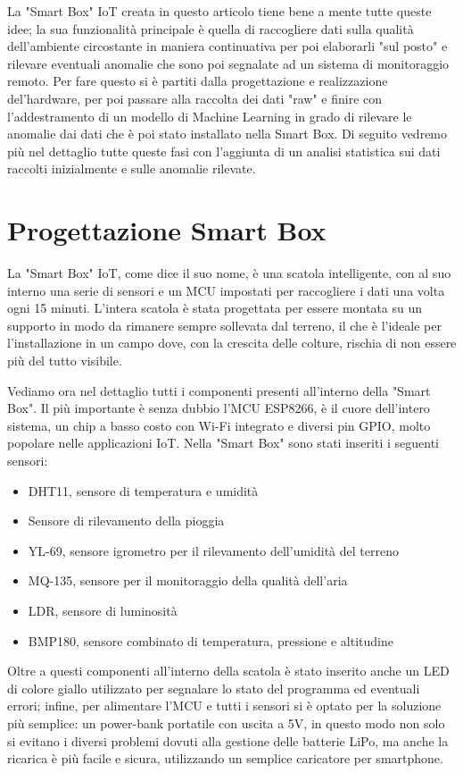 \documentclass[fleqn, 10pt]{SelfArx}
\begin{document}
La "Smart Box" IoT creata in questo articolo tiene bene a mente tutte queste idee; la sua funzionalità principale è quella di raccogliere dati sulla qualità dell'ambiente circostante in maniera continuativa per poi 
elaborarli "sul posto" e rilevare eventuali anomalie che sono poi segnalate ad un sistema di monitoraggio remoto. Per fare questo si è partiti dalla progettazione e realizzazione del'hardware, per poi passare alla raccolta
dei dati "raw" e finire con l'addestramento di un modello di Machine Learning in grado di rilevare le anomalie dai dati che è poi stato installato nella Smart Box.
Di seguito vedremo più nel dettaglio tutte queste fasi con l'aggiunta di un analisi statistica sui dati raccolti inizialmente e sulle anomalie rilevate.

\section{Progettazione Smart Box}

La "Smart Box" IoT, come dice il suo nome, è una scatola intelligente, con al suo interno una serie di sensori e un MCU impostati per raccogliere i dati una volta ogni 15 minuti. L'intera scatola è stata progettata 
per essere montata su un supporto in modo da rimanere sempre sollevata dal terreno, il che è l'ideale per l'installazione in un campo dove, con la crescita delle colture, rischia di non essere più del tutto visibile.

Vediamo ora nel dettaglio tutti i componenti presenti all'interno della "Smart Box". Il più importante è senza dubbio l'MCU ESP8266, è il cuore dell'intero sistema, un chip a basso costo con Wi-Fi integrato e diversi pin
GPIO, molto popolare nelle applicazioni IoT.
Nella "Smart Box" sono stati inseriti i seguenti sensori:

\begin{itemize}
\item DHT11, sensore di temperatura e umidità
\item Sensore di rilevamento della pioggia 
\item YL-69, sensore igrometro per il rilevamento dell'umidità del terreno
\item MQ-135, sensore per il monitoraggio della qualità dell'aria
\item LDR, sensore di luminosità 
\item BMP180, sensore combinato di temperatura, pressione e altitudine
\end{itemize}

Oltre a questi componenti all'interno della scatola è stato inserito anche un LED di colore giallo utilizzato per segnalare lo stato del programma ed eventuali errori; infine, per alimentare l'MCU e tutti i sensori si 
è optato per la soluzione più semplice: un power-bank portatile con uscita a 5V, in questo modo non solo si evitano i diversi problemi dovuti alla gestione delle batterie LiPo, ma anche la ricarica è più 
facile e sicura, utilizzando un semplice caricatore per smartphone.
\end{document}
